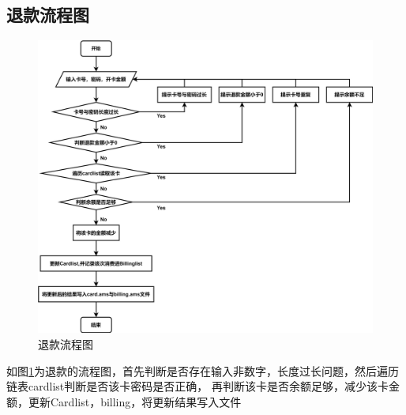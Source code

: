 \documentclass{article}
\begin{document}
    \subsection{退款流程图}
    \begin{figure}[!h]
        \centering
        \includegraphics[scale=0.11]{figure/refund_pic.png}
        \caption{退款流程图}
        \label{refund_pic}
    \end{figure}
    如图\ref{refund_pic}为退款的流程图，首先判断是否存在输入非数字，长度过长问题，然后遍历链表cardlist判断是否该卡密码是否正确，
    再判断该卡是否余额足够，减少该卡金额，更新Cardlist，billing，将更新结果写入文件
    \newpage
\end{document}
